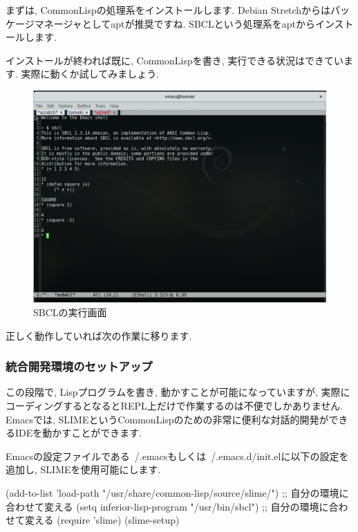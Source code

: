 \documentclass[mingoth,a4paper]{jsarticle}
\begin{document}
まずは, CommonLispの処理系をインストールします. Debian Stretchからはパッケージマネージャとしてaptが推奨ですね. SBCLという処理系をaptからインストールします. 

	
インストールが終われば既に, CommonLispを書き, 実行できる状況はできています. 実際に動くか試してみましょう. 

\begin{figure}[htbp!]
\centering
\includegraphics[width=\linewidth]{image201709-kansai/sbcl.png}
\caption{SBCLの実行画面}
\end{figure}

正しく動作していれば次の作業に移ります. 

\subsubsection{統合開発環境のセットアップ}
この段階で, Lispプログラムを書き, 動かすことが可能になっていますが, 実際にコーディングするとなるとREPL上だけで作業するのは不便でしかありません. 
Emacsでは, SLIMEというCommonLispのための非常に便利な対話的開発ができるIDEを動かすことができます. 


Emacsの設定ファイルである~/.emacsもしくは~/.emacs.d/init.elに以下の設定を追加し, SLIMEを使用可能にします. 


\begin{commandline}
(add-to-list 'load-path "/usr/share/common-lisp/source/slime/") ;; 自分の環境に合わせて変える
(setq inferior-lisp-program "/usr/bin/sbcl") ;; 自分の環境に合わせて変える
(require 'slime)
(slime-setup)
\end{commandline}
\end{document}
